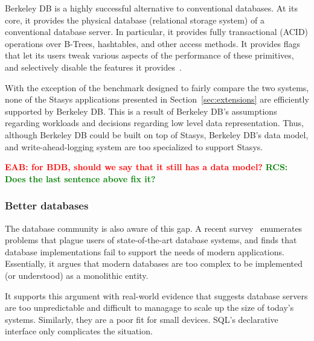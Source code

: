 \documentclass[letterpaper,twocolumn,10pt]{article}
\newcommand{\yad}{Stasys\xspace}
\newcommand{\eab}[1]{\textcolor{red}{\bf EAB: #1}}
\newcommand{\rcs}[1]{\textcolor{green}{\bf RCS: #1}}
\begin{document}

Berkeley DB is a highly successful alternative to conventional
databases.  At its core, it provides the physical database
(relational storage system) of a conventional database server.
In particular, 
it provides fully transactional (ACID) operations over B-Trees, 
hashtables, and other access methods.  It provides flags that 
let its users tweak various aspects of the performance of these
primitives, and selectively disable the features it provides~\cite{libtp}.

With the
exception of the benchmark designed to fairly compare the two systems, none of the \yad 
applications presented in Section~\ref{sec:extensions} are efficiently
supported by Berkeley DB.   This is a result of Berkeley DB's  
assumptions regarding workloads and decisions regarding low level data
representation.  Thus, although Berkeley DB could be built on top of \yad,
Berkeley DB's data model, and write-ahead-logging system are too specialized to support \yad.

\eab{for BDB, should we say that it still has a data model?} \rcs{ Does the last sentence above fix it?}




\subsubsection{Better databases}

The database community is also aware of this gap. 
A recent survey~\cite{riscDB} enumerates problems that plague users of
state-of-the-art database systems, and finds that database implementations fail to support the
needs of modern applications.  Essentially, it argues that modern 
databases are too complex to be implemented (or understood) 
as a monolithic entity.

It supports this argument with real-world evidence that suggests
database servers are too unpredictable and difficult to managage to
scale up the size of today's systems.  Similarly, they are a poor fit
for small devices.  SQL's declarative interface only complicates the
situation.
\end{document}
